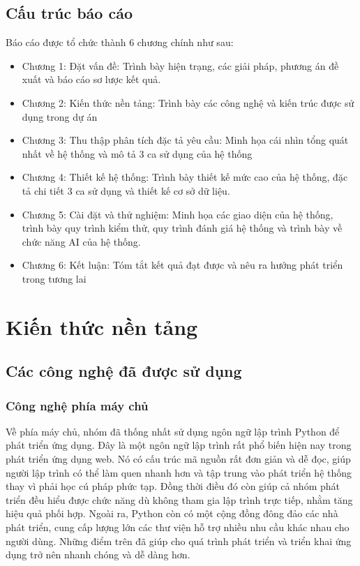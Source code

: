 \documentclass{uetgraduation}
\begin{document}
\section{Cấu trúc báo cáo}
Báo cáo được tổ chức thành 6 chương chính như sau:
\begin{itemize}
    \item Chương 1: Đặt vấn đề: Trình bày hiện trạng, các giải pháp, phương án đề xuất và báo cáo sơ lược kết quả.
    \item Chương 2: Kiến thức nền tảng: Trình bày các công nghệ và kiến trúc được sử dụng trong dự án
    \item Chương 3: Thu thập phân tích đặc tả yêu cầu: Minh họa cái nhìn tổng quát nhất về hệ thống và mô tả 3 ca sử dụng của hệ thống
    \item Chương 4: Thiết kế hệ thống: Trình bày thiết kế mức cao của hệ thống, đặc tả chi tiết 3 ca sử dụng và thiết kế cơ sở dữ liệu.
    \item Chương 5: Cài đặt và thử nghiệm: Minh họa các giao diện của hệ thống, trình bày quy trình kiểm thử, quy trình đánh giá hệ thống và trình bày về chức năng AI của hệ thống.
    \item Chương 6: Kết luận: Tóm tắt kết quả đạt được và nêu ra hướng phát triển trong tương lai
\end{itemize}
\chapter{Kiến thức nền tảng}
\section{Các công nghệ đã được sử dụng}
\subsection {Công nghệ phía máy chủ}

Về phía máy chủ, nhóm đã thống nhất sử dụng ngôn ngữ lập trình Python để phát triển ứng dụng. Đây là một ngôn ngữ lập trình rất phổ biến hiện nay trong phát triển ứng dụng web.
Nó có cấu trúc mã nguồn rất đơn giản và dễ đọc, giúp người lập trình có thể làm quen nhanh hơn và tập trung vào phát triển hệ thống thay vì phải học cú pháp phức tạp. Đồng thời
điều đó còn giúp cả nhóm phát triển đều hiểu được chức năng dù không tham gia lập trình trực tiếp, nhằm tăng hiệu quả phối hợp. Ngoài ra, Python còn có một cộng đồng đông đảo các nhà phát triển,
cung cấp lượng lớn các thư viện hỗ trợ nhiều nhu cầu khác nhau cho người dùng. Những điểm trên đã giúp cho quá trình phát triển và triển khai ứng dụng trở nên nhanh chóng và dễ dàng hơn.\par
\end{document}
